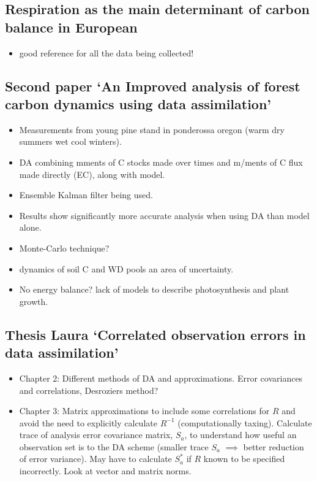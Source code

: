 \documentclass[11pt]{article}
\begin{document}
\subsection*{Respiration as the main determinant of carbon balance in European \cite{valentini2000respiration}}
\noindent
\begin{itemize}
\item good reference for all the data being collected!
\end{itemize}


\subsection*{Second paper `An Improved analysis of forest carbon dynamics using data assimilation' \cite{williams2005improved}}
\begin{itemize}
\item Measurements from young pine stand in ponderossa oregon (warm dry summers wet cool winters).
\item DA combining mments of C stocks made over times and m/ments of C flux made directly (EC), along with model.
\item Ensemble Kalman filter being used.
\item Results show significantly more accurate analysis when using DA than model alone.
\item Monte-Carlo technique?
\item dynamics of soil C and WD pools an area of uncertainty.
\item No energy balance? lack of models to describe photosynthesis and plant growth.
\end{itemize}


\subsection*{Thesis Laura `Correlated observation errors in data assimilation' \cite{stewart2008correlated}}
\begin{itemize}
\item Chapter 2: Different methods of DA and approximations. Error covariances and correlations, Desroziers method?
\item Chapter 3: Matrix approximations to include some correlations for $R$ and avoid the need to explicitly calculate $R^{-1}$ (computationally taxing). Calculate trace of analysis error covariance matrix, $S_{a}$, to understand how useful an observation set is to the DA scheme (smaller trace $S_{a}$ $\implies$ better reduction of error variance). May have to calculate $S_{a}^{*}$ if $R$ known to be specified incorrectly. Look at vector and matrix norms.
\end{itemize}
\end{document}
